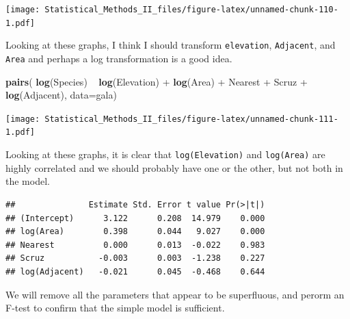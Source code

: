 \documentclass[]{book}
\newenvironment{Shaded}{\begin{snugshade}}{\end{snugshade}}
\newcommand{\KeywordTok}[1]{\textcolor[rgb]{0.13,0.29,0.53}{\textbf{{#1}}}}
\newcommand{\DataTypeTok}[1]{\textcolor[rgb]{0.13,0.29,0.53}{{#1}}}
\newcommand{\DecValTok}[1]{\textcolor[rgb]{0.00,0.00,0.81}{{#1}}}
\newcommand{\StringTok}[1]{\textcolor[rgb]{0.31,0.60,0.02}{{#1}}}
\newcommand{\CommentTok}[1]{\textcolor[rgb]{0.56,0.35,0.01}{\textit{{#1}}}}
\newcommand{\NormalTok}[1]{{#1}}
\theoremstyle{definition}
\theoremstyle{definition}
\theoremstyle{remark}
\begin{document}
\texttt{[image: Statistical\_Methods\_II\_files/figure-latex/unnamed-chunk-110-1.pdf]}

Looking at these graphs, I think I should transform \texttt{elevation},
\texttt{Adjacent}, and \texttt{Area} and perhaps a log transformation is
a good idea.

\begin{Shaded}
\begin{Highlighting}[]
\KeywordTok{pairs}\NormalTok{( }\KeywordTok{log}\NormalTok{(Species) ~}\StringTok{ }\KeywordTok{log}\NormalTok{(Elevation) +}\StringTok{ }\KeywordTok{log}\NormalTok{(Area) +}\StringTok{ }
\StringTok{                       }\NormalTok{Nearest +}\StringTok{ }\NormalTok{Scruz +}\StringTok{ }\KeywordTok{log}\NormalTok{(Adjacent), }\DataTypeTok{data=}\NormalTok{gala)}
\end{Highlighting}
\end{Shaded}

\texttt{[image: Statistical\_Methods\_II\_files/figure-latex/unnamed-chunk-111-1.pdf]}

Looking at these graphs, it is clear that \texttt{log(Elevation)} and
\texttt{log(Area)} are highly correlated and we should probably have one
or the other, but not both in the model.

\begin{Shaded}
\end{Shaded}

\begin{verbatim}
##               Estimate Std. Error t value Pr(>|t|)
## (Intercept)      3.122      0.208  14.979    0.000
## log(Area)        0.398      0.044   9.027    0.000
## Nearest          0.000      0.013  -0.022    0.983
## Scruz           -0.003      0.003  -1.238    0.227
## log(Adjacent)   -0.021      0.045  -0.468    0.644
\end{verbatim}

We will remove all the parameters that appear to be superfluous, and
perorm an F-test to confirm that the simple model is sufficient.
\end{document}
